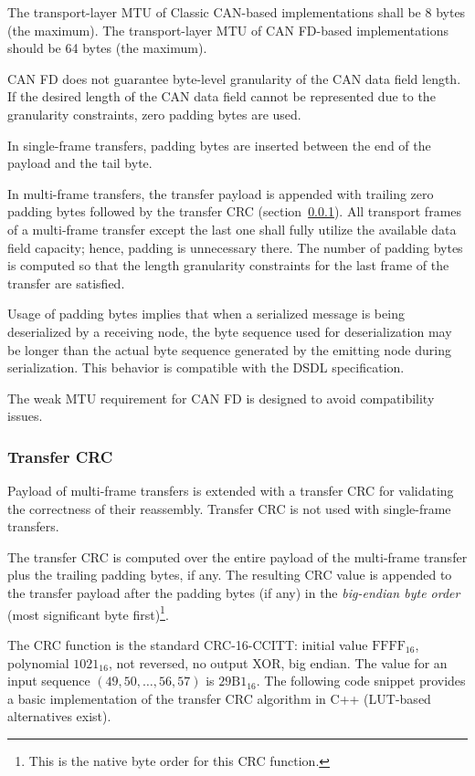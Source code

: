 The transport-layer MTU of Classic CAN-based implementations shall be 8 bytes (the maximum).
The transport-layer MTU of CAN FD-based implementations should be 64 bytes (the maximum).

CAN FD does not guarantee byte-level granularity of the CAN data field length.
If the desired length of the CAN data field cannot be represented due to the granularity constraints,
zero padding bytes are used.

In single-frame transfers, padding bytes are inserted between the end of the payload and the tail byte.

In multi-frame transfers, the transfer payload is appended with trailing zero padding bytes
followed by the transfer CRC (section~\ref{sec:transport_can_transfer_crc}).
All transport frames of a multi-frame transfer except the last one shall fully utilize the available
data field capacity; hence, padding is unnecessary there.
The number of padding bytes is computed so that the length granularity constraints
for the last frame of the transfer are satisfied.

\begin{remark}
    Usage of padding bytes implies that when a serialized message is being deserialized by a receiving node,
    the byte sequence used for deserialization may be longer than the actual byte sequence generated by the
    emitting node during serialization.
    This behavior is compatible with the DSDL specification.

    The weak MTU requirement for CAN FD is designed to avoid compatibility issues.
\end{remark}

\subsubsection{Transfer CRC}\label{sec:transport_can_transfer_crc}

Payload of multi-frame transfers is extended with a transfer CRC for validating the correctness of their reassembly.
Transfer CRC is not used with single-frame transfers.

The transfer CRC is computed over the entire payload of the multi-frame transfer
plus the trailing padding bytes, if any.
The resulting CRC value is appended to the transfer payload after the padding bytes (if any)
in the \emph{big-endian byte order} (most significant byte first)\footnote{%
    This is the native byte order for this CRC function.
}.

The CRC function is the standard CRC-16-CCITT:
initial value $\mathrm{FFFF}_{16}$, polynomial $\mathrm{1021}_{16}$,
not reversed, no output XOR, big endian.
The value for an input sequence $\left(49, 50, \ldots, 56, 57\right)$ is $\mathrm{29B1}_{16}$.
The following code snippet provides a basic implementation of the transfer CRC algorithm in C++
(LUT-based alternatives exist).

